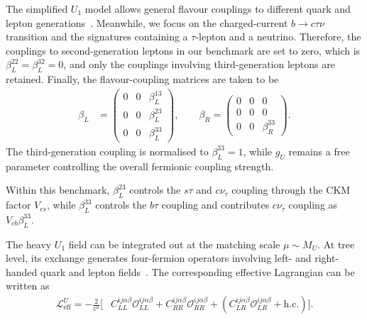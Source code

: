 The simplified $U_{1}$ model allows general flavour couplings to different quark and lepton generations~\cite{Cornella2019}. Meanwhile, we focus on the charged-current $b\rightarrow c\tau\nu$ transition and the signatures containing a $\tau$-lepton and a neutrino. Therefore, the couplings to second-generation leptons in our benchmark are set to zero, which is $\beta_{L}^{22}=\beta_{L}^{32}=0$, and only the couplings involving third-generation leptons are retained. Finally, the flavour-coupling matrices are taken to be
\begin{equation}
    \begin{aligned}
        \beta_{L} &=
        \begin{pmatrix}
            0 & 0 & \beta_{L}^{13} \\
            0 & 0 & \beta_{L}^{23} \\
            0 & 0 & \beta_{L}^{33}
        \end{pmatrix},
        \qquad
        \beta_{R} =
        \begin{pmatrix}
            0 & 0 & 0 \\
            0 & 0 & 0 \\
            0 & 0 & \beta_{R}^{33}
        \end{pmatrix}.
    \end{aligned}
    \label{eq:u1_beta_texture}
\end{equation}
The third-generation coupling is normalised to $\beta_{L}^{33}=1$, while $g_{U}$ remains a free parameter controlling the overall fermionic coupling strength.

Within this benchmark, $\beta_{L}^{23}$ controls the $s\tau$ and $c\nu_\tau$ coupling through the CKM factor $V_{cs}$, while $\beta_L^{33}$ controls the $b\tau$ coupling and contributes $c\nu_\tau$ coupling as $V_{cb}\beta_L^{33}$.


The heavy $U_{1}$ field can be integrated out at the matching scale $\mu\sim M_{U}$.
At tree level, its exchange generates four-fermion operators involving left- and right-handed quark and lepton fields~\cite{Aebischer2022}. The corresponding effective Lagrangian can be written as
\begin{align}
\mathcal{L}_{\mathrm{eff}}^{U}
=
-\frac{2}{v^{2}}
\bigg[
& C_{LL}^{ij\alpha\beta}
\mathcal{O}_{LL}^{ij\alpha\beta}
+
C_{RR}^{ij\alpha\beta}
\mathcal{O}_{RR}^{ij\alpha\beta}
+
\left(
C_{LR}^{ij\alpha\beta}
\mathcal{O}_{LR}^{ij\alpha\beta}
+
\mathrm{h.c.}
\right)
\bigg].
\label{eq:u1_low_energy_effective_lagrangian}
\end{align}


